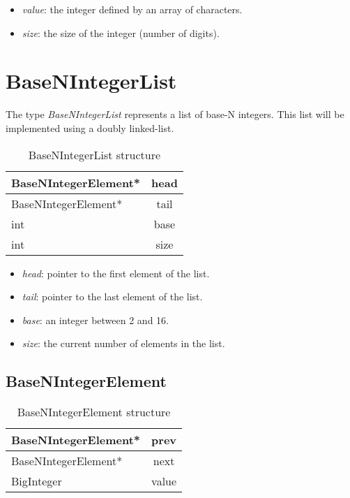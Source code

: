 \documentclass[book, nodocumentinfo]{upmethodology-document}
\begin{document}
\begin{itemize}
    \item \emph{value}: the integer defined by an array of characters.
    \item \emph{size}: the size of the integer (number of digits).
\end{itemize}

\section{BaseNIntegerList} \label{section:basen-integer-list}

The type \emph{BaseNIntegerList} represents a list of base-N integers.
This list will be implemented using a doubly linked-list.

\begin{table}[h]
    \centering
    \label{tab:basenintegerlist-struct}

    \begin{tabular}{|l|c|}
        \hline
        BaseNIntegerElement* & head \\
        \hline
        BaseNIntegerElement* & tail \\
        \hline
        int & base \\
        \hline
        int & size \\
        \hline
    \end{tabular}

    \caption{BaseNIntegerList structure}
\end{table}

\begin{itemize}
    \item \emph{head}: pointer to the first element of the list.
    \item \emph{tail}: pointer to the last element of the list.
    \item \emph{base}: an integer between 2 and 16.
    \item \emph{size}: the current number of elements in the list.
\end{itemize}

\subsection{BaseNIntegerElement}

\begin{table}[h]
    \centering
    \label{tab:basenintegerelement-struct}

    \begin{tabular}{|l|c|}
        \hline
        BaseNIntegerElement* & prev \\
        \hline
        BaseNIntegerElement* & next \\
        \hline
        BigInteger & value \\
        \hline
    \end{tabular}

    \caption{BaseNIntegerElement structure}
\end{table}
\end{document}
